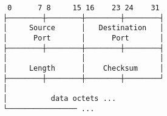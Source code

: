 \documentclass[varwidth,crop]{standalone}
\begin{document}
\begin{verbatim}
 0      7 8     15 16    23 24    31
├────────┼────────┼────────┼────────┤
│     Source      │   Destination   │
│      Port       │      Port       │
├────────┼────────┼────────┼────────┤
│                 │                 │
│     Length      │    Checksum     │
├────────┼────────┼────────┼────────┘
│
│          data octets ...
└──────────────── ...
\end{verbatim}
\end{document}
